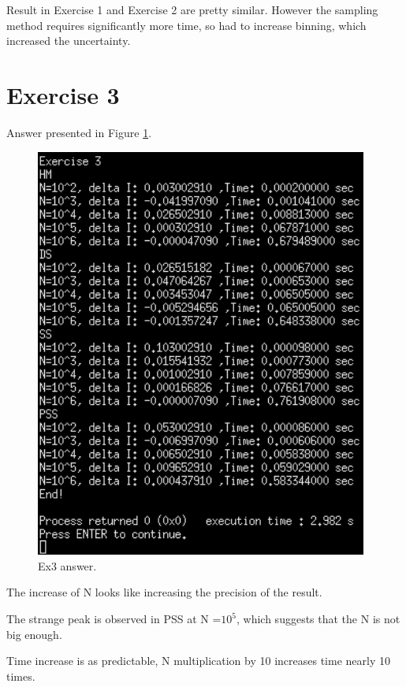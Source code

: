 \documentclass{article}
\begin{document}
Result in Exercise 1 and Exercise 2 are pretty similar. However the sampling method requires significantly more time, so had to increase binning, which increased the uncertainty.

\clearpage

\section{Exercise 3}
Answer presented in Figure \ref{fig:ex3_answer}.
\begin{figure}[!hbt]
	\centering
	\includegraphics[width=4.3in]{ex3_answer}
	\caption{Ex3 answer.}
	\label{fig:ex3_answer}
\end{figure}

The increase of N looks like increasing the precision of the result.

The strange peak is observed in PSS at N =$10^5$, which suggests that the N is not big enough.

Time increase is as predictable, N multiplication by 10 increases time nearly 10 times.
\end{document}
